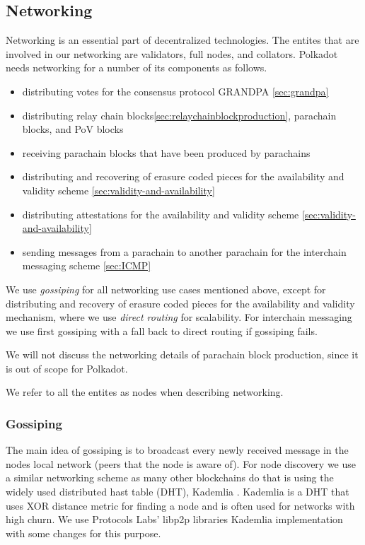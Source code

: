 \subsection{Networking}\label{sec:networking}
Networking is an essential part of decentralized technologies.
The entites that are involved in our networking are validators, full nodes, and collators.
Polkadot needs networking for a number of its components as follows.
\begin{itemize}
\item distributing votes for the consensus protocol GRANDPA \ref{sec:grandpa}
\item distributing relay chain blocks\ref{sec:relaychainblockproduction}, parachain blocks, and PoV blocks
\item receiving parachain blocks that have been produced by parachains
\item distributing and recovering of erasure coded pieces for the availability and validity scheme \ref{sec:validity-and-availability}
\item distributing attestations for the availability and validity scheme \ref{sec:validity-and-availability}
\item sending messages from a parachain to another parachain for the interchain messaging scheme \ref{sec:ICMP}
\end{itemize}

We use \emph{gossiping} for all networking use cases mentioned above, except for distributing and recovery of erasure coded pieces for the availability and validity mechanism, where we use \emph{direct routing} for scalability.
For interchain messaging we use first gossiping with a fall back to direct routing if gossiping fails.

We will not discuss the networking details of parachain block production, since it is out of scope for Polkadot.

We refer to all the entites as nodes when describing networking.


\subsubsection{Gossiping}
The main idea of gossiping is to broadcast every newly received message in the nodes local network (peers that the node is aware of).
For node discovery we use a similar networking scheme as many other blockchains do that is using the widely used distributed hast table (DHT), Kademlia \cite{Maymounkov:2002:Kademila}.
Kademlia is a DHT that uses XOR distance metric for finding a node and is often used for networks with high churn.
We use Protocols Labs' libp2p libraries \cite{} Kademlia implementation with some changes for this purpose.

